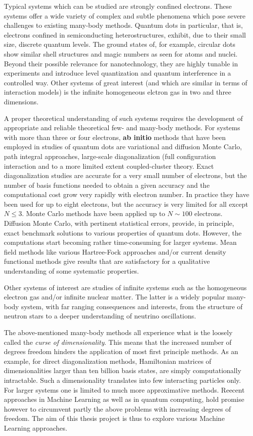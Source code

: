 \documentclass[%
oneside,                 %
final,                   %
10pt]{article}
\begin{document}
Typical systems which can be studied are strongly confined
electrons. These systems offer a wide variety of complex and subtle
phenomena which pose severe challenges to existing many-body methods.
Quantum dots in particular, that is, electrons confined in
semiconducting heterostructures, exhibit, due to their small size,
discrete quantum levels.  The ground states of, for example, circular
dots show similar shell structures and magic numbers as seen for atoms
and nuclei.  Beyond their possible relevance for nanotechnology, they
are highly tunable in experiments and introduce level quantization and
quantum interference in a controlled way. Other systems of great
interest (and which are similar in terms of interaction models) is the
infinite homogeneous elctron gas in two and three dimensions.

A proper theoretical understanding of such systems requires the
development of appropriate and reliable theoretical few- and many-body
methods.  For systems with more than three or four electrons, \textbf{ab
initio} methods that have been employed in studies of quantum dots are
variational and diffusion Monte Carlo, path integral approaches,
large-scale diagonalization (full configuration interaction and to a
more limited extent coupled-cluster theory.  Exact diagonalization
studies are accurate for a very small number of electrons, but the
number of basis functions needed to obtain a given accuracy and the
computational cost grow very rapidly with electron number.  In
practice they have been used for up to eight electrons, but the
accuracy is very limited for all except $N\le 3$.  Monte Carlo methods
have been applied up to $N\sim 100$ electrons. Diffusion Monte Carlo,
with pertinent statistical errors, provide, in principle, exact
benchmark solutions to various properties of quantum dots. However,
the computations start becoming rather time-consuming for larger
systems.  Mean field methods like various Hartree-Fock approaches
and/or current density functional methods give results that are
satisfactory for a qualitative understanding of some systematic properties.

Other systems of interest are studies of infinite systems such as the
homogeneous electron gas and/or infinite nuclear matter.  The latter
is a widely popular many-body system, with far ranging consequences
and interests, from the structure of neutron stars to a deeper
understanding of neutrino oscillations.

The above-mentioned many-body methods all experience what
is the loosely called the \emph{curse of dimensionality}. This means that
the increased number of degrees freedom hinders the application of
most first principle methods. As an example, for direct
diagonalization methods, Hamiltonian matrices of dimensionalities
larger than ten billion basis states, are simply computationally
intractable. Such a dimensionality translates into few interacting
particles only. For larger systems one is limited to much more
approximative methods.  Reecent approaches in Machine Learning as well
as in quantum computing, hold promise however to circumvent partly the
above problems with increasing degrees of freedom.  The aim of this thesis project is
thus to explore various Machine Learning
approaches.
\end{document}
